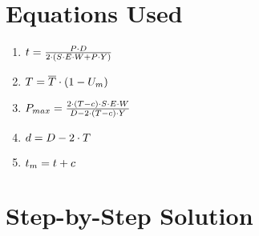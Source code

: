 \documentclass[11pt,a4paper]{article}
\begin{document}
\section{Equations Used}

\begin{enumerate}
\item $\Large t = \frac{P  \cdot  D}{2   \cdot  (S  \cdot  E  \cdot  W + P  \cdot  Y)}$
\item $\Large T = \overline{T}  \cdot  (1  - U_m)$
\item $\Large P_{max} = \frac{2   \cdot  (T - c)  \cdot  S  \cdot  E  \cdot  W}{D - 2   \cdot  (T - c)  \cdot  Y}$
\item $\Large d = D - 2   \cdot  T$
\item $\Large t_{m} = t + c$
\end{enumerate}

\section{Step-by-Step Solution}
\end{document}
